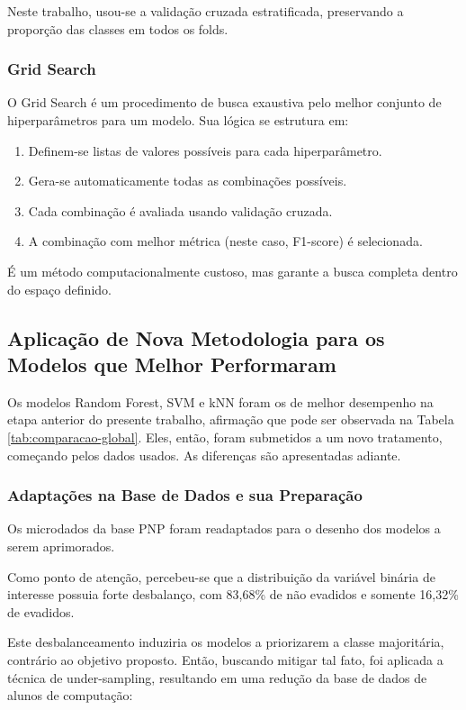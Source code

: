 \documentclass[english, spanish, brazilian]{RBIEarticle} %
\begin{document}
Neste trabalho, usou-se a validação cruzada estratificada, preservando a proporção das classes em todos os folds.

\subsubsection{Grid Search}

O Grid Search é um procedimento de busca exaustiva pelo melhor conjunto de hiperparâmetros para um modelo. Sua lógica se estrutura em:

\begin{enumerate}
    \item Definem-se listas de valores possíveis para cada hiperparâmetro.
    \item Gera-se automaticamente todas as combinações possíveis.
    \item Cada combinação é avaliada usando validação cruzada.
    \item A combinação com melhor métrica (neste caso, F1-score) é selecionada.
\end{enumerate}

É um método computacionalmente custoso, mas garante a busca completa dentro do espaço definido.


\subsection{Aplicação de Nova Metodologia para os Modelos que Melhor Performaram}
Os modelos Random Forest, SVM e kNN foram os de melhor desempenho na etapa anterior do presente trabalho, afirmação que pode ser observada na Tabela \ref{tab:comparacao-global}. Eles, então, foram submetidos a um novo tratamento, começando pelos dados usados. As diferenças são apresentadas adiante.

\subsubsection{Adaptações na Base de Dados e sua Preparação}
Os microdados da base PNP foram readaptados para o desenho dos modelos a serem aprimorados.

Como ponto de atenção, percebeu-se que a distribuição da variável binária de interesse possuia forte desbalanço, com 83,68\% de não evadidos e somente 16,32\% de evadidos.

Este desbalanceamento induziria os modelos a priorizarem a classe majoritária, contrário ao objetivo proposto. Então, buscando mitigar tal fato, foi aplicada a técnica de under-sampling, resultando em uma redução da base de dados de alunos de computação:
\end{document}
